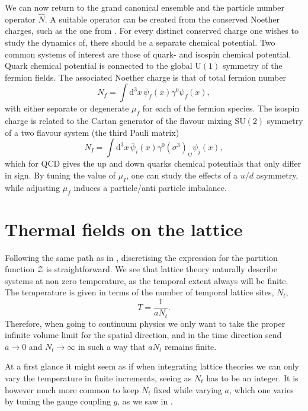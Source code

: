 We can now return to the grand canonical ensemble and the particle number
operator $\hat{N}$. A suitable operator can be created from the conserved
Noether charges, such as the one from . For every
distinct conserved charge one wishes to study the dynamics of, there should be a
separate chemical potential. Two common systems of interest are those of quark-
and isospin chemical potential. Quark chemical potential is connected to the
global U$(1)$ symmetry of the fermion fields. The associated Noether charge is
that of total fermion number
%
\begin{equation} \label{eq-quark-number-density-op}
  N_f = \int \mathrm{d}^3 x \, \bar{\psi}_f(x) \gamma^0 \psi_f(x),
\end{equation}
%
with either separate or degenerate $\mu_f$ for each of the fermion species. The
isospin charge is related to the Cartan generator of the flavour mixing SU$(2)$
symmetry of a two flavour system (the third Pauli matrix)
%
\begin{equation}
  N_I  = \int \mathrm{d}^3 x \, \bar{\psi}_i(x) \gamma^0 (\sigma^3)_{ij}
    \psi_j(x),
\end{equation}
%
which for QCD gives the up and down quarks chemical potentials that only differ
in sign. By tuning the value of $\mu_I$, one can study the effects of a $u/d$
asymmetry, while adjusting $\mu_f$ induces a particle/anti particle imbalance.

\section{Thermal fields on the lattice} \label{sec-thermal-lattice-theory}

Following the same path as in , discretising the
expression for the partition function $\mathcal{Z}$ is straightforward. We see
that lattice theory naturally describe systems at non zero temperature, as the
temporal extent always will be finite. The temperature is given in terms of the
number of temporal lattice sites, $N_t$,
%
\begin{equation}
  T = \frac{1}{a N_t}.
\end{equation}
%
Therefore, when going to continuum physics we only want to take the proper
infinite volume limit for the spatial direction, and in the time direction send
$a\to0$ and $N_t\to\infty$ in such a way that $a N_t$ remains finite.

At a first glance it might seem as if when integrating lattice theories we can
only vary the temperature in finite increments, seeing as $N_t$ has to be an integer.
It is however much more common to keep $N_t$ fixed while varying $a$, which one
varies by tuning the gauge coupling $g$, as we saw in .

